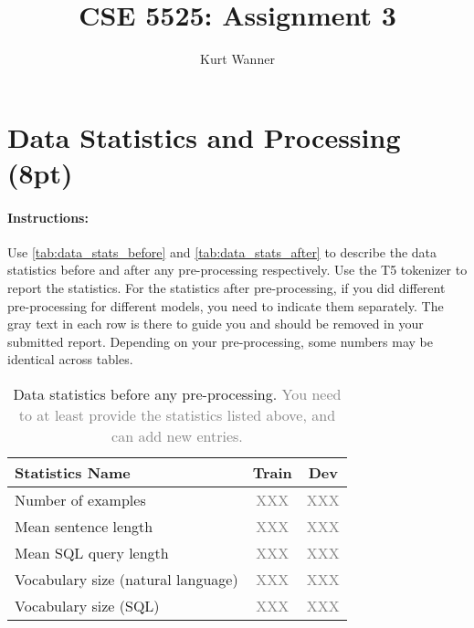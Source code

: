 \documentclass{article}
\title{CSE 5525: Assignment 3}
\author{Kurt Wanner}
\date{}
\begin{document}
\maketitle


\section{Data Statistics and Processing (8pt)}
\paragraph{Instructions:} Use \autoref{tab:data_stats_before} and \autoref{tab:data_stats_after} to describe the data statistics before and after any pre-processing respectively. 
Use the T5 tokenizer to report the statistics. 
For the statistics after pre-processing, if you did different pre-processing for different models, you need to indicate them separately.
The gray text in each row is there to guide you and should be removed in your submitted report.
Depending on your pre-processing, some numbers may be identical across tables. 

\begin{table}[h!]
\centering
\begin{tabular}{lcc}
\toprule
Statistics Name & Train & Dev \\
\midrule
Number of examples & \textcolor{gray}{XXX} & \textcolor{gray}{XXX} \\
Mean sentence length & \textcolor{gray}{XXX}& \textcolor{gray}{XXX} \\
Mean SQL query length & \textcolor{gray}{XXX}& \textcolor{gray}{XXX}  \\
Vocabulary size (natural language)& \textcolor{gray}{XXX}& \textcolor{gray}{XXX}  \\
Vocabulary size (SQL)& \textcolor{gray}{XXX}& \textcolor{gray}{XXX}  \\
\bottomrule
\end{tabular}
\caption{Data statistics before any pre-processing. \textcolor{gray}{You need to at least provide the statistics listed above, and can add new entries.}}
\label{tab:data_stats_before}
\end{table}
\end{document}
